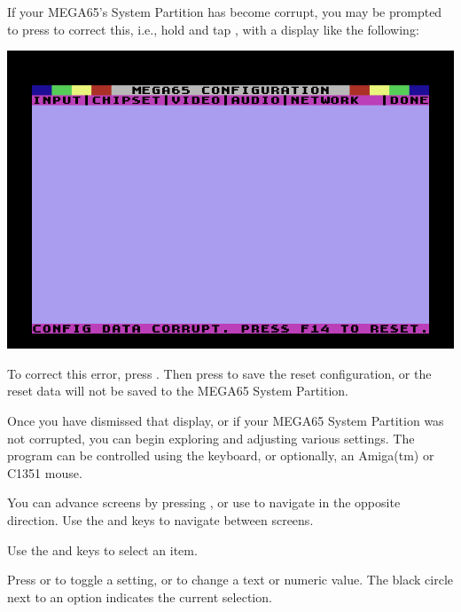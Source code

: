 \begin{minipage}{\linewidth}
  If your MEGA65's System Partition has become corrupt, you may be
  prompted to press  to correct this, i.e., hold  and tap
  , with a display like the following:

  \vspace{5mm}
  \includegraphics[width=\linewidth]{images/ss-m65config-corrupt.png}
\end{minipage}

To correct this error, press . Then press  to save the reset configuration, or the reset data will not be saved to the MEGA65 System
Partition.

Once you have dismissed that display, or if your MEGA65 System Partition was not corrupted, you can begin exploring and adjusting various settings. The program can be controlled using the keyboard, or optionally, an Amiga(tm) or C1351 mouse.

You can advance screens by pressing , or use  to navigate in the opposite direction. Use the \megakey{$\leftarrow$} and \megakey{$\rightarrow$} keys to navigate between screens.

Use the \megakey{$\uparrow$} and \megakey{$\downarrow$} keys to select an item.

Press  or  to toggle a setting, or to change a text or numeric value. The black circle next to an option indicates the current selection.

